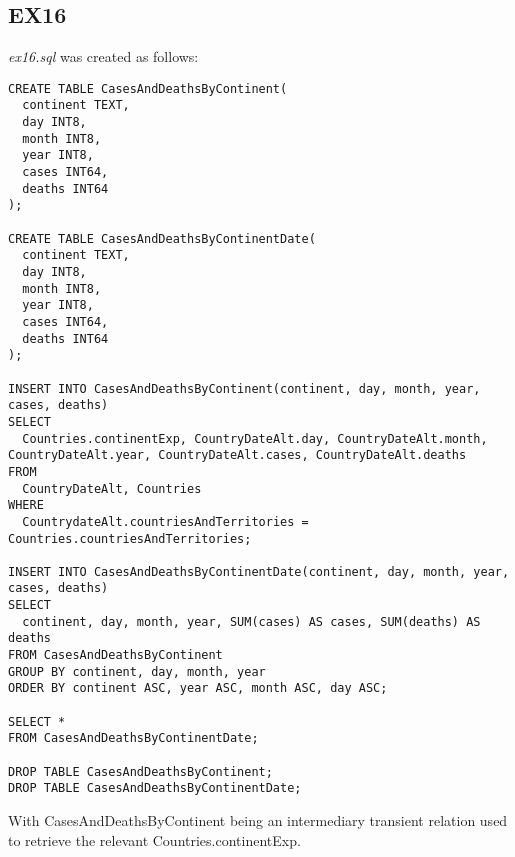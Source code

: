 \documentclass{article}
\begin{document}
\subsection{EX16}
\textit{ex16.sql} was created as follows: 
\begin{verbatim}
CREATE TABLE CasesAndDeathsByContinent(
  continent TEXT,
  day INT8,
  month INT8,
  year INT8,
  cases INT64,
  deaths INT64
);

CREATE TABLE CasesAndDeathsByContinentDate(
  continent TEXT,
  day INT8,
  month INT8,
  year INT8,
  cases INT64,
  deaths INT64
);

INSERT INTO CasesAndDeathsByContinent(continent, day, month, year, cases, deaths)
SELECT
  Countries.continentExp, CountryDateAlt.day, CountryDateAlt.month, CountryDateAlt.year, CountryDateAlt.cases, CountryDateAlt.deaths
FROM
  CountryDateAlt, Countries
WHERE
  CountrydateAlt.countriesAndTerritories = Countries.countriesAndTerritories;

INSERT INTO CasesAndDeathsByContinentDate(continent, day, month, year, cases, deaths)
SELECT
  continent, day, month, year, SUM(cases) AS cases, SUM(deaths) AS deaths
FROM CasesAndDeathsByContinent
GROUP BY continent, day, month, year
ORDER BY continent ASC, year ASC, month ASC, day ASC;

SELECT *
FROM CasesAndDeathsByContinentDate;

DROP TABLE CasesAndDeathsByContinent;
DROP TABLE CasesAndDeathsByContinentDate;
\end{verbatim}
With CasesAndDeathsByContinent being an intermediary transient relation used to retrieve the relevant Countries.continentExp. 
\end{document}
